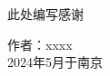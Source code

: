 
\begin{acknowledgement}

此处编写感谢

\vspace{5cm}
\begin{flushright}
	作者：xxxx\\
	2024年5月于南京
\end{flushright}

\end{acknowledgement}

